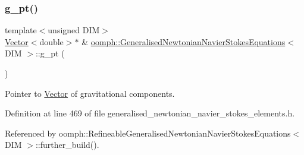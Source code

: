 \subsubsection{\texorpdfstring{g\+\_\+pt()}{g\_pt()}}
{\footnotesize\ttfamily template$<$unsigned D\+IM$>$ \\
\hyperlink{classoomph_1_1Vector}{Vector}$<$double$>$$\ast$ \& \hyperlink{classoomph_1_1GeneralisedNewtonianNavierStokesEquations}{oomph\+::\+Generalised\+Newtonian\+Navier\+Stokes\+Equations}$<$ D\+IM $>$\+::g\+\_\+pt (\begin{DoxyParamCaption}{ }\end{DoxyParamCaption})\hspace{0.3cm}{\ttfamily [inline]}}



Pointer to \hyperlink{classoomph_1_1Vector}{Vector} of gravitational components. 



Definition at line 469 of file generalised\+\_\+newtonian\+\_\+navier\+\_\+stokes\+\_\+elements.\+h.



Referenced by oomph\+::\+Refineable\+Generalised\+Newtonian\+Navier\+Stokes\+Equations$<$ D\+I\+M $>$\+::further\+\_\+build().

\mbox{\label{classoomph_1_1GeneralisedNewtonianNavierStokesEquations_a2ad8ab14cdeff6f411fe2c97cb12b431}} 
